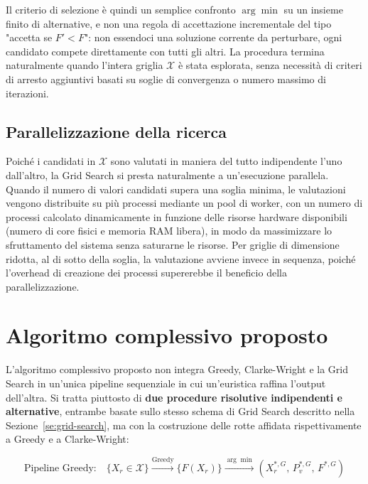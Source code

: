 Il criterio di selezione è quindi un semplice confronto $\arg\min$ su un insieme finito di alternative, e non una regola di accettazione incrementale del tipo "accetta se $F' < F$": non essendoci una soluzione corrente da perturbare, ogni candidato compete direttamente con tutti gli altri. La procedura termina naturalmente quando l'intera griglia $\mathcal{X}$ è stata esplorata, senza necessità di criteri di arresto aggiuntivi basati su soglie di convergenza o numero massimo di iterazioni.

\subsection{Parallelizzazione della ricerca}

Poiché i candidati in $\mathcal{X}$ sono valutati in maniera del tutto indipendente l'uno dall'altro, la Grid Search si presta naturalmente a un'esecuzione parallela. Quando il numero di valori candidati supera una soglia minima, le valutazioni vengono distribuite su più processi mediante un pool di worker, con un numero di processi calcolato dinamicamente in funzione delle risorse hardware disponibili (numero di core fisici e memoria RAM libera), in modo da massimizzare lo sfruttamento del sistema senza saturarne le risorse. Per griglie di dimensione ridotta, al di sotto della soglia, la valutazione avviene invece in sequenza, poiché l'overhead di creazione dei processi supererebbe il beneficio della parallelizzazione.

\section{Algoritmo complessivo proposto}\label{se:algoritmo-complessivo}

L'algoritmo complessivo proposto non integra Greedy, Clarke-Wright e la Grid Search in un'unica pipeline sequenziale in cui un'euristica raffina l'output dell'altra. Si tratta piuttosto di \textbf{due procedure risolutive indipendenti e alternative}, entrambe basate sullo stesso schema di Grid Search descritto nella Sezione~\ref{se:grid-search}, ma con la costruzione delle rotte affidata rispettivamente a Greedy e a Clarke-Wright:

\begin{equation}
	\text{Pipeline Greedy:} \quad \{X_r \in \mathcal{X}\} \xrightarrow{\text{Greedy}} \{F(X_r)\} \xrightarrow{\arg\min} (X_r^{*,G},\,P_v^{*,G},\,F^{*,G})
\end{equation}

